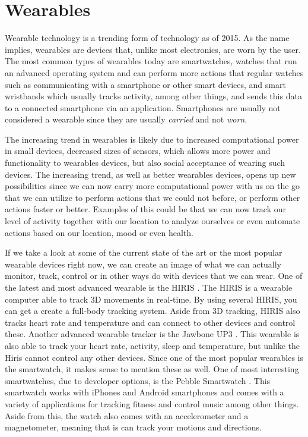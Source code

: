 \section{Wearables}\label{sec:wearables} %
Wearable technology is a trending form of technology as of 2015.  As the name implies, wearables are devices that, unlike most electronics, are worn by the user. The most common types of wearables today are smartwatches, \ie watches that run an advanced operating system and can perform more actions that regular watches such as communicating with a smartphone or other smart devices, and smart wristbands which usually tracks activity, among other things, and sends this data to a connected smartphone via an application. Smartphones are usually not considered a wearable since they are usually \emph{carried} and not \emph{worn}. 

The increasing trend in wearables is likely due to increased computational power in small devices, decreased sizes of sensors, which allows more power and functionality to wearables devices, but also social acceptance of wearing such devices.  The increasing trend, as well as better wearables devices, opens up new possibilities since we can now carry more computational power with us on the go that we can utilize to perform actions that we could not before, or perform other actions faster or better. Examples of this could be that we can now track our level of activity together with our location to analyze ourselves or even automate actions based on our location, mood or even health. 

If we take a look at some of the current state of the art or the most popular wearable devices right now, we can create an image of what we can actually monitor, track, control or in other ways do with devices that we can wear. One of the latest and most advanced wearable is the HIRIS \cite{HIRIS}. The HIRIS is a wearable computer able to track 3D movements in real-time. By using several HIRIS, you can get a create a full-body tracking system. Aside from 3D tracking, HIRIS also tracks heart rate and temperature and can connect to other devices and control these. Another advanced wearable tracker is the Jawbone UP3 \cite{JAWBONE}. This wearable is also able to track your heart rate, activity, sleep and temperature, but unlike the Hiris cannot control any other devices. Since one of the most popular wearables is the smartwatch, it makes sense to mention these as well. One of most interesting smartwatches, due to developer options, is the Pebble Smartwatch \cite{PEBBLE}. This smartwatch works with iPhones and Android smartphones and comes with a variety of applications for tracking fitness and control music among other things. Aside from this, the watch also comes with an accelerometer and a magnetometer, meaning that is can track your motions and directions. 

